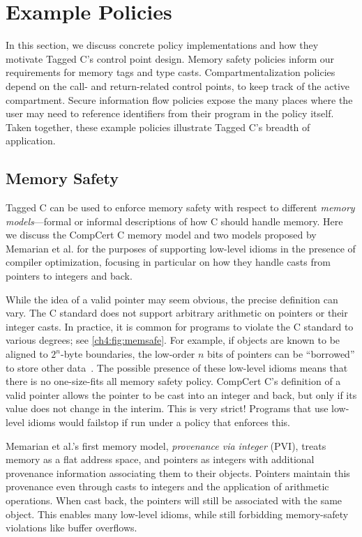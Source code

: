 \section{Example Policies}
\label{ch4:sec:policies}

In this section, we discuss concrete policy implementations and how 
they motivate Tagged C's control point design. Memory safety policies
inform our requirements for memory tags and type casts. Compartmentalization
policies depend on the call- and return-related control points, to keep track of the
active compartment. Secure information flow policies expose the many places
where the user may need to reference identifiers from their program in the policy itself.
Taken together, these example policies illustrate Tagged C's breadth of application.

\subsection{Memory Safety}
\label{ch4:sec:memsafe}

Tagged C can be used to enforce memory safety with respect to different {\em memory models}---formal
or informal descriptions of how C should handle memory. Here we discuss the CompCert C
memory model and two models proposed by Memarian et al. \cite{Memarian19:ExploringCSemantics}
for the purposes of supporting low-level idioms in the presence of compiler optimization, focusing in particular on how they handle
casts from pointers to integers and back.

While the idea of a valid pointer may seem obvious, the precise definition can vary. The C standard
does not support arbitrary arithmetic on pointers or their integer casts.  In practice, it is common for programs to violate the
C standard to various degrees; see \cref{ch4:fig:memsafe}. For example, if objects are known to be aligned to \(2^n\)-byte boundaries,
the low-order \(n\) bits of pointers can be ``borrowed'' to store other data~\cite{Memarian16:DeFacto}.
The possible presence of these low-level idioms means that there is no one-size-fits all memory safety policy.
CompCert C's definition of a valid pointer allows the pointer to be cast into an integer and back, but only if its value
does not change in the interim. This is very strict! Programs that use low-level idioms
would failstop if run under a policy that enforces this.

Memarian et al.'s first memory model, {\em provenance via integer} (PVI), treats memory
as a flat address space, and pointers as integers with additional provenance information
associating them to their objects. Pointers maintain this provenance even through casts to
integers and the application of arithmetic operations. When cast back, the pointers will still
be associated with the same object. This enables many low-level idioms, while still forbidding
memory-safety violations like buffer overflows.

